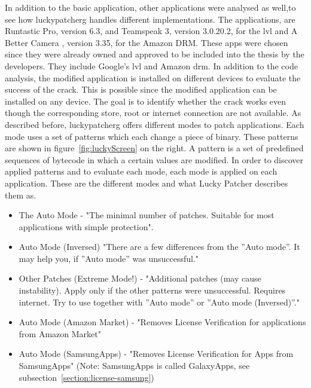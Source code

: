 In addition to the basic application, other applications were analysed as well,to see how \gls{luckypatcherg} handles different implementations.
The applications, are Runtastic Pro\cite{runtasticApp}, version 6.3, and Teamspeak 3\cite{teamspeakApp}, version 3.0.20.2, for the \gls{lvl} and A Better Camera \cite{abettercamera}, version 3.35, for the Amazon DRM.
These apps were chosen since they were already owned and approved to be included into the thesis by the developers.
They include Google’s \gls{lvl} and Amazon \gls{drm}.
\newline
In addition to the code analysis, the modified application is installed on different devices to evaluate the success of the crack.
This is possible since the modified application can be installed on any device.
The goal is to identify whether the crack works even though the corresponding store, root or internet connection are not available.
\newline
As described before, \gls{luckypatcherg} offers different modes to patch applications.
Each mode uses a set of patterns which each change a piece of binary.
These patterns are shown in figure~\ref{fig:luckyScreen} on the right.
A pattern is a set of predefined sequences of bytecode in which a certain values are modified.
In order to discover applied patterns and to evaluate each mode, each mode is applied on each application.
\newline
These are the different modes and what Lucky Patcher describes them as.
\begin{itemize}
\item The Auto Mode - "The minimal number of patches. Suitable for most applications with simple protection".
\item Auto Mode (Inversed) "There are a few differences from the ”Auto mode”. It may help you, if ”Auto mode” was unsuccessful."
\item Other Patches (Extreme Mode!) - "Additional patches (may cause instability). Apply only if the other patterns were unsuccessful. Requires internet. Try to use together with ”Auto mode” or ”Auto mode (Inversed)”."
\item Auto Mode (Amazon Market) - "Removes License Verification for applications from Amazon Market"
\item Auto Mode (SamsungApps) - "Removes License Verification for Apps from SamsungApps" (Note: SamsungApps is called GalaxyApps, see subsection~\ref{section:license-samsung})
\end{itemize}
